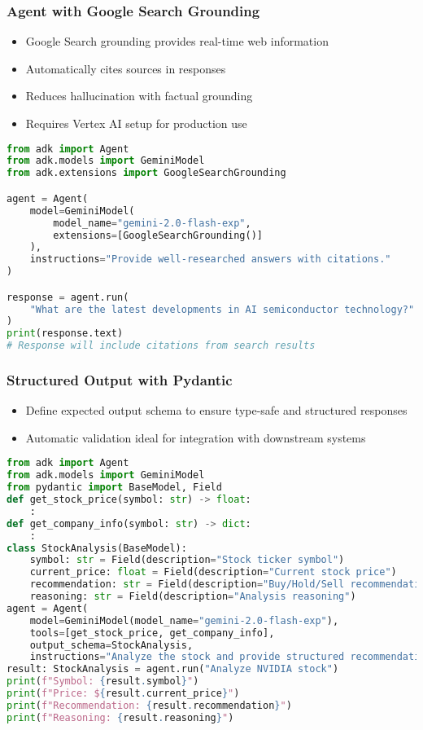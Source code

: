 \begin{frame}[fragile]\frametitle{Agent with Google Search Grounding}
      \begin{itemize}
	\item Google Search grounding provides real-time web information
	\item Automatically cites sources in responses
	\item Reduces hallucination with factual grounding
	\item Requires Vertex AI setup for production use
	  \end{itemize}
      
      \begin{lstlisting}[language=python, basicstyle=\tiny]
from adk import Agent
from adk.models import GeminiModel
from adk.extensions import GoogleSearchGrounding

agent = Agent(
    model=GeminiModel(
        model_name="gemini-2.0-flash-exp",
        extensions=[GoogleSearchGrounding()]
    ),
    instructions="Provide well-researched answers with citations."
)

response = agent.run(
    "What are the latest developments in AI semiconductor technology?"
)
print(response.text)
# Response will include citations from search results
      \end{lstlisting}
\end{frame}

\begin{frame}[fragile]\frametitle{Structured Output with Pydantic}
      \begin{itemize}
	\item Define expected output schema to ensure type-safe and structured responses
	\item Automatic validation ideal for integration with downstream systems
	  \end{itemize}
      
      \begin{lstlisting}[language=python, basicstyle=\tiny]
from adk import Agent
from adk.models import GeminiModel
from pydantic import BaseModel, Field
def get_stock_price(symbol: str) -> float:
    :
def get_company_info(symbol: str) -> dict:
    :
class StockAnalysis(BaseModel):
    symbol: str = Field(description="Stock ticker symbol")
    current_price: float = Field(description="Current stock price")
    recommendation: str = Field(description="Buy/Hold/Sell recommendation")
    reasoning: str = Field(description="Analysis reasoning")
agent = Agent(
    model=GeminiModel(model_name="gemini-2.0-flash-exp"),
    tools=[get_stock_price, get_company_info],
    output_schema=StockAnalysis,
    instructions="Analyze the stock and provide structured recommendation.")
result: StockAnalysis = agent.run("Analyze NVIDIA stock")
print(f"Symbol: {result.symbol}")
print(f"Price: ${result.current_price}")
print(f"Recommendation: {result.recommendation}")
print(f"Reasoning: {result.reasoning}")
      \end{lstlisting}
\end{frame}

